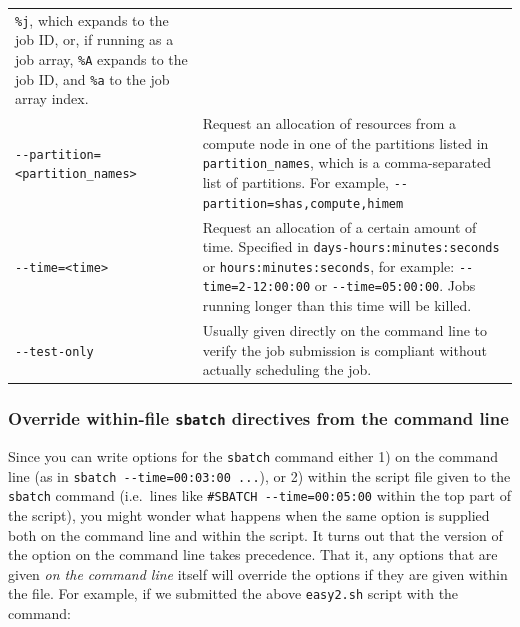 \documentclass[]{krantz}
\begin{document}
\begin{longtable}[]{@{}ll@{}}
\begin{minipage}[t]{0.46\columnwidth}
\texttt{\%j}, which expands to the job
ID, or, if running as a job
array, \texttt{\%A} expands to the job
ID, and \texttt{\%a} to the job array
index.\strut
\end{minipage}\tabularnewline
\begin{minipage}[t]{0.44\columnwidth}\raggedright
\texttt{-\/-partition=\textless{}partition\_names\textgreater{}}\strut
\end{minipage} & \begin{minipage}[t]{0.46\columnwidth}\raggedright
Request an allocation of
resources from a compute node
in one of the partitions
listed in \texttt{partition\_names},
which is a comma-separated
list of partitions. For
example,
\texttt{-\/-partition=shas,compute,himem}\strut
\end{minipage}\tabularnewline
\begin{minipage}[t]{0.44\columnwidth}\raggedright
\texttt{-\/-time=\textless{}time\textgreater{}}\strut
\end{minipage} & \begin{minipage}[t]{0.46\columnwidth}\raggedright
Request an allocation of a
certain amount of time.
Specified in
\texttt{days-hours:minutes:seconds}
or \texttt{hours:minutes:seconds},
for example:
\texttt{-\/-time=2-12:00:00} or
\texttt{-\/-time=05:00:00}. Jobs
running longer than this time
will be killed.\strut
\end{minipage}\tabularnewline
\begin{minipage}[t]{0.44\columnwidth}\raggedright
\texttt{-\/-test-only}\strut
\end{minipage} & \begin{minipage}[t]{0.46\columnwidth}\raggedright
Usually given directly on the
command line to verify the job
submission is compliant
without actually scheduling
the job.\strut
\end{minipage}\tabularnewline
\bottomrule
\end{longtable}

\hypertarget{override-within-file-sbatch-directives-from-the-command-line}{%
\subsubsection{\texorpdfstring{Override within-file \texttt{sbatch} directives from the command line}{Override within-file sbatch directives from the command line}}\label{override-within-file-sbatch-directives-from-the-command-line}}

Since you can write options for the \texttt{sbatch} command either 1) on the command
line (as in \texttt{sbatch\ -\/-time=00:03:00\ ...}), or 2) within the script file given to
the \texttt{sbatch} command (i.e.~lines like \texttt{\#SBATCH\ -\/-time=00:05:00} within
the top part of the script), you might wonder what happens when the same
option is supplied both on the command line and within the script.
It turns out that the version of the option on the command line takes precedence.
That it, any options that are given \emph{on the command line} itself will
override the options if they are given within the file. For example,
if we submitted the above \texttt{easy2.sh} script with the command:
\end{document}
